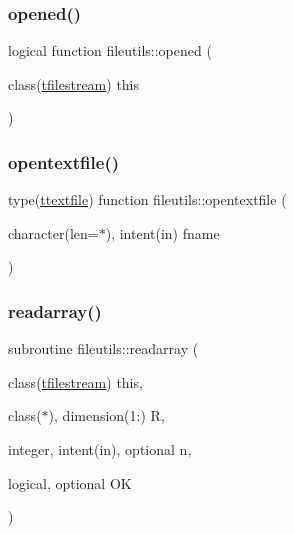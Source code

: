 \mbox{\label{namespacefileutils_ab874a71428e21012e34c256de9cf461d}} 
\subsubsection{\texorpdfstring{opened()}{opened()}}
{\footnotesize\ttfamily logical function fileutils\+::opened (\begin{DoxyParamCaption}\item[{class(\mbox{\hyperlink{structfileutils_1_1tfilestream}{tfilestream}})}]{this }\end{DoxyParamCaption})\hspace{0.3cm}{\ttfamily [private]}}

\mbox{\label{namespacefileutils_a12160238f4fcdecaed130c680db7405a}} 
\subsubsection{\texorpdfstring{opentextfile()}{opentextfile()}}
{\footnotesize\ttfamily type(\mbox{\hyperlink{structfileutils_1_1ttextfile}{ttextfile}}) function fileutils\+::opentextfile (\begin{DoxyParamCaption}\item[{character(len=$\ast$), intent(in)}]{fname }\end{DoxyParamCaption})\hspace{0.3cm}{\ttfamily [private]}}

\mbox{\label{namespacefileutils_a77d1826f1c337fc426cfbc7a8d2b642a}} 
\subsubsection{\texorpdfstring{readarray()}{readarray()}}
{\footnotesize\ttfamily subroutine fileutils\+::readarray (\begin{DoxyParamCaption}\item[{class(\mbox{\hyperlink{structfileutils_1_1tfilestream}{tfilestream}})}]{this,  }\item[{class($\ast$), dimension(1\+:)}]{R,  }\item[{integer, intent(in), optional}]{n,  }\item[{logical, optional}]{OK }\end{DoxyParamCaption})\hspace{0.3cm}{\ttfamily [private]}}



